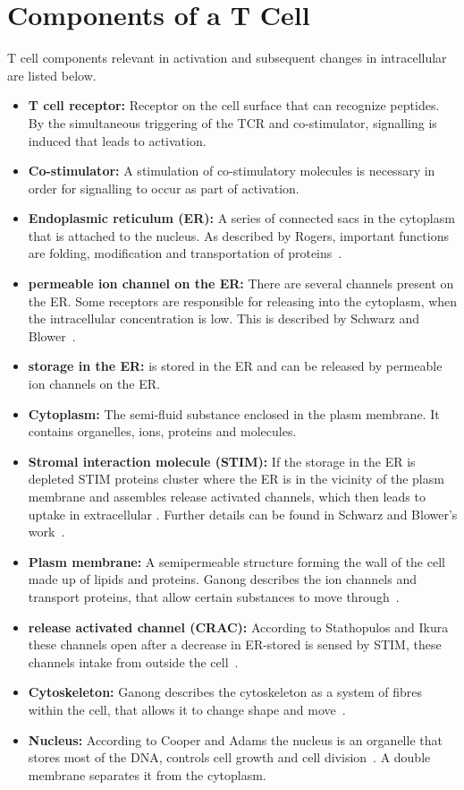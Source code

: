 \section{Components of a T Cell}

T cell components relevant in activation and subsequent changes in intracellular \Calcium are listed below.

\begin{itemize}
	\item \textbf{T cell receptor:} Receptor on the cell surface that can recognize peptides. By the simultaneous triggering of the TCR and co-stimulator, signalling is induced that leads to activation.
	\item \textbf{Co-stimulator:} A stimulation of co-stimulatory molecules is necessary in order for signalling to occur as part of activation.
	\item \textbf{Endoplasmic reticulum (ER):} A series of connected sacs in the cytoplasm that is attached to the nucleus. As described by Rogers, important functions are folding, modification and transportation of proteins~\cite{Rogers2024}.
	\item \textbf{\Calcium permeable ion channel on the ER:} There are several \Calcium channels present on the ER. Some receptors are responsible for releasing \Calcium into the cytoplasm, when the intracellular \Calcium concentration is low. This is described by Schwarz and Blower~\cite{Schwarz2016}.
	\item \textbf{\Calcium storage in the ER:} \Calcium is stored in the ER and can be released by \Calcium permeable ion channels on the ER.
	\item \textbf{Cytoplasm:} The semi-fluid substance enclosed in the plasm membrane. It contains organelles, ions, proteins and molecules.
	\item \textbf{Stromal interaction molecule (STIM):} If the \Calcium storage in the ER is depleted STIM proteins cluster where the ER is in the vicinity of the plasm membrane and assembles \Calcium release activated \Calcium channels, which then leads to uptake in extracellular \Calcium. Further details can be found in Schwarz and Blower's work~\cite{Schwarz2016}.
	\item \textbf{Plasm membrane:} A semipermeable structure forming the wall of the cell made up of lipids and proteins. Ganong describes the ion channels and transport proteins, that allow certain substances to move through~\cite{Ganong2012}.
	\item \textbf{\Calcium release activated \Calcium channel (CRAC):} According to Stathopulos and Ikura these channels open after a decrease in ER-stored \Calcium is sensed by STIM, these channels intake \Calcium from outside the cell~\cite{Stathopulos2013}.
	\item \textbf{Cytoskeleton:} Ganong describes the cytoskeleton as a system of fibres within the cell, that allows it to change shape and move~\cite{Ganong2012}.
	\item \textbf{Nucleus:} According to Cooper and Adams the nucleus is an organelle that stores most of the DNA, controls cell growth and cell division~\cite{cooper2022}. A double membrane separates it from the cytoplasm.
\end{itemize}

